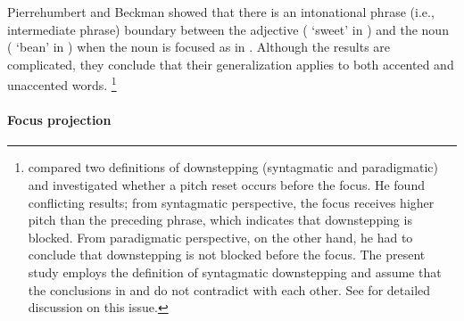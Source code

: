 Pierrehumbert and Beckman showed that
there is an intonational phrase (i.e., intermediate phrase) boundary
between the adjective ( `sweet' in \Last[A]) and the noun ( `bean' in \Last[b])
when the noun is focused as in \Last.
Although the results are complicated,
they conclude that their generalization applies to both accented and unaccented words.%
 \footnote{
  compared two definitions of downstepping (syntagmatic and paradigmatic) and investigated whether a pitch reset occurs before the focus.
 He found conflicting results;
 from syntagmatic perspective, the focus receives higher pitch than the preceding phrase, which indicates that downstepping is blocked.
 From paradigmatic perspective, on the other hand,
 he had to conclude that downstepping is not blocked before the focus.
 The present study employs the definition of syntagmatic downstepping
 and assume that the conclusions in  and  do not contradict with each other.
 See  for detailed discussion on this issue.
 }



\paragraph{Focus projection}

